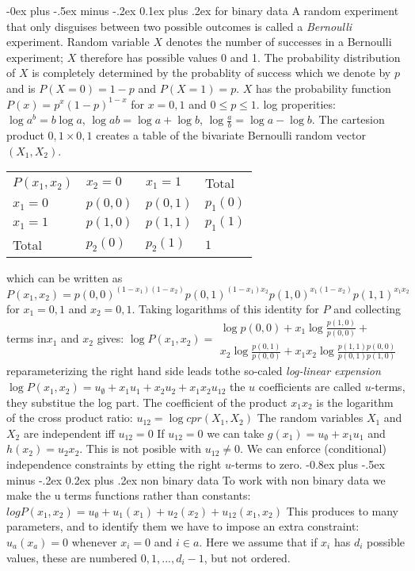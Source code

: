 \documentclass[8pt,landscape]{extarticle}
\makeatletter
\renewcommand{\subsection}{\@startsection{subsection}{2}{0mm}%
                                {-0.8ex plus -.5ex minus -.2ex}%
                                {0.2ex plus .2ex}%
                                {\normalfont\normalsize\bfseries}}
\renewcommand{\subsubsection}{\@startsection{subsubsection}{3}{0mm}%
                                {-0ex plus -.5ex minus -.2ex}%
                                {0.1ex plus .2ex}%
                                {\normalfont\small\bfseries}}
\makeatother
\begin{document}
\begin{multicols}{3}
\subsubsection{for binary data}
A random experiment that only disguises between two possible outcomes is
called a \emph{Bernoulli} experiment. Random variable $X$ denotes the number of
successes in a Bernoulli experiment; $X$ therefore has possible values 0 and 1.
The probability distribution of $X$ is completely determined by the probablity of
success which we denote by $p$  and is $P(X=0) = 1 - p $ and $ P(X=1)=p$.
$X$ has the probability function $P(x)=p^x(1-p)^{1-x}$ for $x=0,1$ and
$0 \leq p \leq 1$.
log properities: $\log a^b=b \log a$, $\log ab = \log a + \log b$,
$\log \frac{a}{b}=\log a - \log b$.
The cartesion product 
${0,1} \times {0,1}$ creates a table of the bivariate Bernoulli random
vector $(X_1,X_2)$.
\begin{tabular}{llll}
  $P(x_1,x_2)$ & $x_2=0$ & $x_1=1$ & Total \\
  $x_1=0$ & $p(0,0)$ & $p(0,1)$ & $p_1(0)$ \\
  $x_1=1$ & $p(1,0)$ & $p(1,1)$ & $p_1(1)$ \\
  Total & $p_2(0)$ & $p_2(1)$ & $1$ \\
\end{tabular}
which can be written as
$P(x_1,x_2)=p(0,0)^{(1-x_1)(1-x_2)}p(0,1)^{(1-x_1)x_2}p(1,0)^{x_1(1-x_2)}p(1,1)^{x_1x_2}$
for $x_1=0,1$ and $x_2=0,1$.
Taking logarithms of this identity for $P$ and collecting terms in$x_1$ and
$x_2$ gives:
$\log P(x_1,x_2)= \begin{matrix}
    \log p(0,0) + x_1 \log \frac{p(1,0)}{p(0,0)} +  \\
    x_2 \log \frac{p(0,1)}{p(0,0)} + x_1 x_2 \log \frac{p(1,1)p(0,0)}{p(0,1)p(1,0)}
    \end{matrix}
$
reparameterizing the right hand side leads tothe so-caled \emph{log-linear expension}
$\log P(x_1,x_2)=u_\emptyset+ x_1u_1 + x_2 u_2 + x_1 x_2 u_{12}$
the $u$ coefficients are called $u$-terms, they substitue the log part.
The coefficient of the product $x_1x_2$ is the logarithm of the cross product
ratio:
$u_{12}=\log cpr(X_1,X_2)$
The random variables $X_1$ and $X_2$ are independent iff $u_{12}=0$
If $u_{12}=0$ we can take $g(x_1)=u_\emptyset + x_1 u_1$ and $h(x_2)= u_2 x_2$.
This is not posible with $u_{12}\neq 0$.
We can enforce (conditional) independence constraints by etting the right
$u$-terms to zero.
\subsection{non binary data}
To work with non binary data we make the u terms functions rather than constants:
$log P(x_1,x_2)=u_\emptyset + u_1(x_1) + u_2(x_2) + u_{12}(x_1,x_2)$
This produces to many parameters, and to identify them we have to impose
an extra constraint: $u_a(x_a)=0$ whenever $x_i=0$ and $i\in a$. Here we
assume that if $x_i$ has $d_i$ possible values, these are numbered
$0,1,...,d_i-1$, but not ordered.

\end{multicols}
\end{document}
